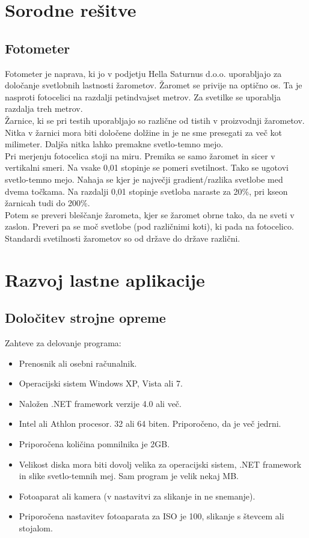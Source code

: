 \documentclass[oneside, a4paper, 12pt]{book}
\begin{document}
\chapter{Sorodne rešitve}
\section{Fotometer}
Fotometer je naprava, ki jo v podjetju Hella Saturnus d.o.o. uporabljajo za določanje svetlobnih lastnosti žarometov. Žaromet se privije na optično os. Ta je nasproti fotocelici na razdalji petindvajset metrov. Za svetilke se uporablja razdalja treh metrov. \\
Žarnice, ki se pri testih uporabljajo so različne od tistih v proizvodnji žarometov. Nitka v žarnici mora biti določene dolžine in je ne sme presegati za več kot milimeter. Daljša nitka lahko premakne svetlo-temno mejo.\\
Pri merjenju fotocelica stoji na miru. Premika se samo žaromet in sicer v vertikalni smeri. Na vsake 0,01 stopinje se pomeri svetilnost. Tako se ugotovi svetlo-temno mejo. Nahaja se kjer je največji gradient/razlika svetlobe med dvema točkama. Na razdalji 0,01 stopinje svetloba naraste za 20\%, pri kseon žarnicah tudi do 200\%.\\
Potem se preveri bleščanje žarometa, kjer se žaromet obrne tako, da ne sveti v zaslon. Preveri pa se moč svetlobe (pod različnimi koti), ki pada na fotocelico.   \\
Standardi svetilnosti žarometov so od države do države različni. 

\chapter{Razvoj lastne aplikacije}
\section{Določitev strojne opreme}
Zahteve za delovanje programa:
\begin{itemize}
\item Prenosnik ali osebni računalnik.
\item Operacijski sistem Windows XP, Vista ali 7.
\item Naložen .NET framework verzije 4.0 ali več.
\item Intel ali Athlon procesor. 32 ali 64 biten. Priporočeno, da je več jedrni.
\item Priporočena količina pomnilnika je 2GB.
\item Velikost diska mora biti dovolj velika za operacijski sistem, .NET framework in slike svetlo-temnih mej. Sam program je velik nekaj MB. 
\item Fotoaparat ali kamera (v nastavitvi za slikanje in ne snemanje).
\item Priporočena nastavitev fotoaparata za ISO je 100, slikanje s števcem ali stojalom.
\end{itemize}
\end{document}
